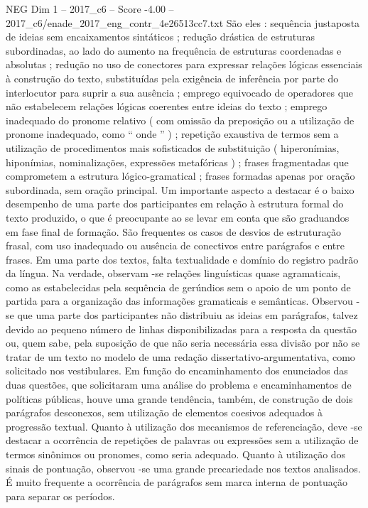 \begin{textsample}{NEG Dim 1 – 2017\_c6 – Score -4.00 – 2017\_c6/enade\_2017\_eng\_contr\_4e26513cc7.txt}
São eles : sequência justaposta de ideias sem encaixamentos sintáticos ; redução drástica de estruturas subordinadas, ao lado do aumento na frequência de estruturas coordenadas e absolutas ; redução no uso de conectores para expressar relações lógicas essenciais à construção do texto, substituídas pela exigência de inferência por parte do interlocutor para suprir a sua ausência ; emprego equivocado de operadores que não estabelecem relações lógicas coerentes entre ideias do texto ; emprego inadequado do pronome relativo ( com omissão da preposição ou a utilização de pronome inadequado, como “ onde ” ) ; repetição exaustiva de termos sem a utilização de procedimentos mais sofisticados de substituição ( hiperonímias, hiponímias, nominalizações, expressões metafóricas ) ; frases fragmentadas que comprometem a estrutura lógico-gramatical ; frases formadas apenas por oração subordinada, sem oração principal.
Um importante aspecto a destacar é o baixo desempenho de uma parte dos participantes em relação à estrutura formal do texto produzido, o que é preocupante ao se levar em conta que são graduandos em fase final de formação.
São frequentes os casos de desvios de estruturação frasal, com uso inadequado ou ausência de conectivos entre parágrafos e entre frases.
Em uma parte dos textos, falta textualidade e domínio do registro padrão da língua.
Na verdade, observam -se relações linguísticas quase agramaticais, como as estabelecidas pela sequência de gerúndios sem o apoio de um ponto de partida para a organização das informações gramaticais e semânticas.
Observou -se que uma parte dos participantes não distribuiu as ideias em parágrafos, talvez devido ao pequeno número de linhas disponibilizadas para a resposta da questão ou, quem sabe, pela suposição de que não seria necessária essa divisão por não se tratar de um texto no modelo de uma redação dissertativo-argumentativa, como solicitado nos vestibulares.
Em função do encaminhamento dos enunciados das duas questões, que solicitaram uma análise do problema e encaminhamentos de políticas públicas, houve uma grande tendência, também, de construção de dois parágrafos desconexos, sem utilização de elementos coesivos adequados à progressão textual.
Quanto à utilização dos mecanismos de referenciação, deve -se destacar a ocorrência de repetições de palavras ou expressões sem a utilização de termos sinônimos ou pronomes, como seria adequado.
Quanto à utilização dos sinais de pontuação, observou -se uma grande precariedade nos textos analisados.
É muito frequente a ocorrência de parágrafos sem marca interna de pontuação para separar os períodos.

\end{textsample}
